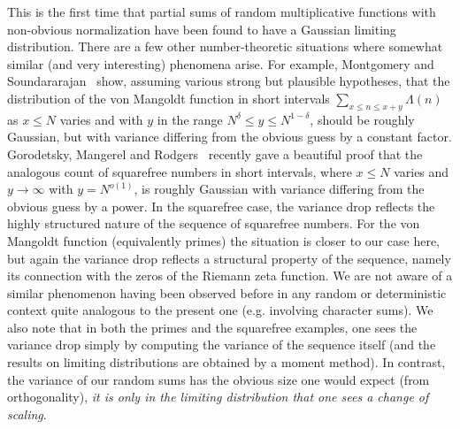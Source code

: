 \documentclass[12pt, notitlepage]{amsart}
\numberwithin{equation}{section}
\theoremstyle{remark}
\theoremstyle{definition}
\theoremstyle{remark}
\numberwithin{equation}{section}
\begin{document}
This is the first time that partial sums of random multiplicative functions with non-obvious normalization have been found to have a Gaussian limiting distribution. There are a few other number-theoretic situations where somewhat similar (and very interesting) phenomena arise.
For example, Montgomery and Soundararajan~\cite{MS04} show, assuming various strong but plausible hypotheses, that the distribution of the von Mangoldt function in short intervals  $\sum_{x \leq n \leq x+y} \Lambda(n)$ as $x \leq N$ varies and with $y$ in the range $N^{\delta} \leq y \leq N^{1-\delta}$, should be roughly Gaussian, but with variance differing from the obvious guess by a constant factor. Gorodetsky, Mangerel and Rodgers~\cite{GMR} recently gave a beautiful proof that the analogous count of squarefree numbers in short intervals, where $x \leq N$ varies and $y \rightarrow \infty$ with $y = N^{o(1)}$, is roughly Gaussian with variance differing from the obvious guess by a power. In the squarefree case, the variance drop reflects the highly structured nature of the sequence of squarefree numbers. For the von Mangoldt function (equivalently primes) the situation is closer to our case here, but again the variance drop reflects a structural property of the sequence, namely its connection with the zeros of the Riemann zeta function. We are not aware of a similar phenomenon having been observed before in any random or deterministic context quite analogous to the present one (e.g. involving character sums). We also note that in both the primes and the squarefree examples, one sees the variance drop simply by computing the variance of the sequence itself (and the results on limiting distributions are obtained by a moment method). In contrast, the variance of our random sums has the obvious size one would expect (from orthogonality), {\em it is only in the limiting distribution that one sees a change of scaling}.
\end{document}
